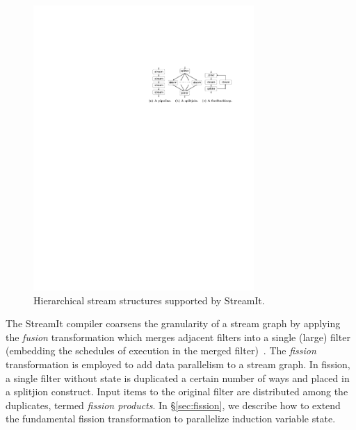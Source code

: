 \begin{figure}[t!]
\centering
\includegraphics[width=3.3in]{stream-structures.pdf}
\caption{Hierarchical stream structures supported by StreamIt.\protect\label{fig:structures}}
\end{figure}

The StreamIt compiler coarsens the granularity of a stream graph by
applying the {\it fusion} transformation which merges adjacent filters
into a single (large) filter (embedding the schedules of execution in
the merged filter)~\cite{streamit-asplos}.  The {\it fission}
transformation is employed to add data parallelism to a stream graph.
In fission, a single filter without state is duplicated a certain
number of ways and placed in a splitjion construct.  Input items to
the original filter are distributed among the duplicates, termed {\it
  fission products}.  In \S\ref{sec:fission}, we describe how to
extend the fundamental fission transformation to parallelize induction
variable state.
